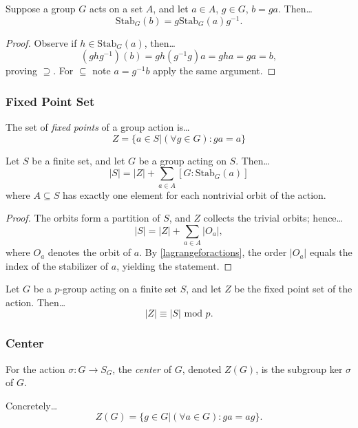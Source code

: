 \begin{proposition}
Suppose a group $G$ acts on a set $A$, and let $a \in A$, $g \in G$, $b = ga$. Then\dots
$$\textrm{Stab}_G(b) = g\textrm{Stab}_G(a)g^{-1}.$$
\end{proposition}

\begin{proof}
Observe if $h \in \textrm{Stab}_G(a)$, then\dots
$$(ghg^{-1})(b) = gh(g^{-1}g)a = gha = ga = b,$$
proving $\supseteq$. For $\subseteq$ note $a = g^{-1}b$ apply the same argument.
\end{proof}

\subsubsection{Fixed Point Set}
The set of \emph{fixed points} of a group action is\dots
$$Z = \{ a \in S | (\forall g \in G) : ga = a \}$$

\begin{proposition}
Let $S$ be a finite set, and let $G$ be a group acting on $S$. Then\dots
$$|S| = |Z| + \sum_{a \in A} [G : \textrm{Stab}_G(a)]$$
where $A \subseteq S$ has exactly one element for each nontrivial orbit of the action.
\end{proposition}

\begin{proof}
The orbits form a partition of $S$, and $Z$ collects the trivial orbits; hence\dots
$$|S| = |Z| + \sum_{a \in A} |O_a|,$$
where $O_a$ denotes the orbit of $a$. By \ref{lagrangeforactions}, the order $|O_a|$
equals the index of the stabilizer of $a$, yielding the statement.
\end{proof}

\begin{corollary}
\label{fixedpointrestriction}
Let $G$ be a $p$-group acting on a finite set $S$, and let $Z$ be the fixed point set of the action. Then\dots
$$|Z| \equiv |S| \textrm{ mod } p.$$
\end{corollary}

\subsubsection{Center}\label{center}
For the action $\sigma : G \rightarrow S_G$, the \emph{center} of $G$, denoted $Z(G)$, is the subgroup ker $\sigma$ of $G$.\newline

\noindent Concretely\dots
$$Z(G) = \{ g \in G | (\forall a \in G) : ga = ag \}.$$

